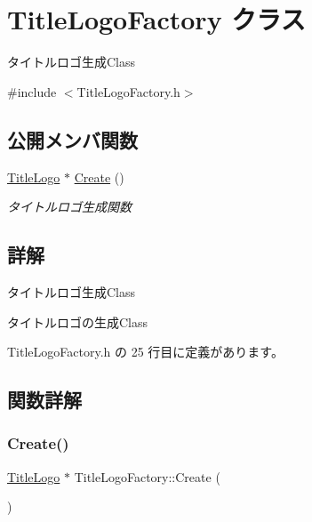 \hypertarget{class_title_logo_factory}{}\section{Title\+Logo\+Factory クラス}
\label{class_title_logo_factory}


タイトルロゴ生成\+Class  




{\ttfamily \#include $<$Title\+Logo\+Factory.\+h$>$}

\subsection*{公開メンバ関数}
\begin{DoxyCompactItemize}
\item 
\mbox{\hyperlink{class_title_logo}{Title\+Logo}} $\ast$ \mbox{\hyperlink{class_title_logo_factory_abd7c5693ef9e36fc224b51968402e2a0}{Create}} ()
\begin{DoxyCompactList}\small\item\em タイトルロゴ生成関数 \end{DoxyCompactList}\end{DoxyCompactItemize}


\subsection{詳解}
タイトルロゴ生成\+Class 

タイトルロゴの生成\+Class 

 Title\+Logo\+Factory.\+h の 25 行目に定義があります。



\subsection{関数詳解}
\mbox{\label{class_title_logo_factory_abd7c5693ef9e36fc224b51968402e2a0}} 
\subsubsection{\texorpdfstring{Create()}{Create()}}
{\footnotesize\ttfamily \mbox{\hyperlink{class_title_logo}{Title\+Logo}} $\ast$ Title\+Logo\+Factory\+::\+Create (\begin{DoxyParamCaption}{ }\end{DoxyParamCaption})}



